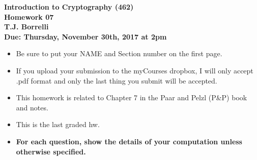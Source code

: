 \documentclass[12pt]{article}
\begin{document}
\begin{center}
{\bf 
Introduction to Cryptography (462) \\
Homework 07\\
T.J. Borrelli\\
Due: Thursday, November 30th, 2017 at 2pm
}

\end{center}



\begin{itemize}
\item Be sure to put your NAME and Section number on the first page. 
\item If you upload your submission to the myCourses dropbox, I will only accept .pdf format and only the last thing you submit will be accepted. 
\item This homework is related to Chapter 7 in the Paar and Pelzl (P\&P) book and notes. 
\item This is the last graded hw. 
\item {\bf For each question, show the details of your computation unless otherwise specified. } 
\end{itemize}
\end{document}
